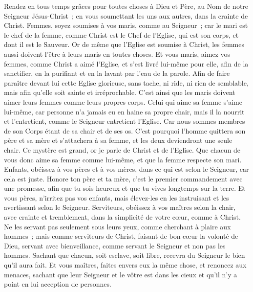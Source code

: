 \begin{multicols}{2}
Rendez en tous temps grâces pour toutes choses à Dieu et Père, au Nom de notre Seigneur Jésus-Christ~;
en vous soumettant les uns aux autres, dans la crainte de Christ.
Femmes, soyez soumises à vos maris, comme au Seigneur~;
car le mari est le chef de la femme, comme Christ est le Chef de l'Eglise, qui est son corps, et dont il est le Sauveur.
Or de même que l'Eglise est soumise à Christ, les femmes aussi doivent l'être à leurs maris en toutes choses.
Et vous maris, aimez vos femmes, comme Christ a aimé l'Eglise, et s'est livré lui-même pour elle,
afin de la sanctifier, en la purifiant et en la lavant par l'eau de la parole.
Afin de faire paraître devant lui cette Eglise glorieuse, sans tache, ni ride, ni rien de semblable, mais afin qu'elle soit sainte et irréprochable.
C'est ainsi que les maris doivent aimer leurs femmes comme leurs propres corps. Celui qui aime sa femme s'aime lui-même,
car personne n'a jamais eu en haine sa propre chair, mais il la nourrit et l'entretient, comme le Seigneur entretient l'Eglise.
Car nous sommes membres de son Corps étant de sa chair et de ses os.
C'est pourquoi l'homme quittera son père et sa mère et s'attachera à sa femme, et les deux deviendront une seule chair.
Ce mystère est grand, or je parle de Christ et de l'Eglise.
Que chacun de vous donc aime sa femme comme lui-même, et que la femme respecte son mari.
\VerseOne{}Enfants, obéissez à vos pères et à vos mères, dans ce qui est selon le Seigneur, car cela est juste.
Honore ton père et ta mère, c'est le premier commandement avec une promesse,
afin que tu sois heureux et que tu vives longtemps sur la terre.
Et vous pères, n'irritez pas vos enfants, mais élevez-les en les instruisant et les avertissant selon le Seigneur.
Serviteurs, obéissez à vos maîtres selon la chair, avec crainte et tremblement, dans la simplicité de votre cœur, comme à Christ.
Ne les servant pas seulement sous leurs yeux, comme cherchant à plaire aux hommes~; mais comme serviteurs de Christ, faisant de bon cœur la volonté de Dieu,
servant avec bienveillance, comme servant le Seigneur et non pas les hommes.
Sachant que chacun, soit esclave, soit libre, recevra du Seigneur le bien qu'il aura fait.
Et vous maîtres, faites envers eux la même chose, et renoncez aux menaces, sachant que leur Seigneur et le vôtre est dans les cieux et qu'il n'y a point en lui acception de personnes.

\end{multicols}
